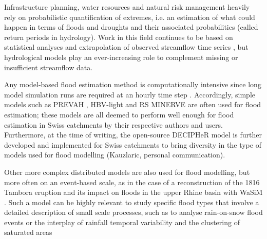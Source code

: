 \documentclass[10pt,a4paper]{article}
\begin{document}
Infrastructure planning, water resources and natural risk management heavily rely on probabilistic quantification of extremes, i.e. an estimation of what could happen in terms of floods and droughts and their associated probabilities (called return periods in hydrology). Work in this field continues to be based on statistical analyses and extrapolation of observed streamflow time series \citep{Brunner2018, Asadi20108}, but hydrological models play an ever-increasing role to complement missing or insufficient streamflow data.

Any model-based flood estimation method is computationally intensive since long model simulation runs are required at an hourly time step \citep[see][about reducing computational requirements for extreme flood estimation by hydrological modelling]{SikorskaSenoner2020}. Accordingly, simple models such as PREVAH \citep{Viviroli2009, Viviroli2009c, Felder2017}, HBV-light \citep{Sikorska2017, Brunner2019a, SikorskaSenoner2020} and  RS MINERVE \citep{Bieri2013, Zeimetz2017, Zeimetz2018} are often used for flood estimation; these models are all deemed to perform well enough for flood estimation in Swiss catchments by their respective authors and users. Furthermore, at the time of writing, the open-source DECIPHeR model is further developed and implemented for Swiss catchments to bring diversity in the type of models used for flood modelling (Kauzlaric, personal communication).

Other more complex distributed models are also used for flood modelling, but more often on an event-based scale, as in the case of a reconstruction of the 1816 Tambora eruption and its impact on floods in the upper Rhine basin with WaSiM \citep[see Fig. \ref{fig:map};][]{Rossler2018}. Such a model can be highly relevant to study specific flood types that involve a detailed description of small scale processes, such as to analyse  rain-on-snow flood events \citep[][with WaSiM]{Rossler2014} or the interplay of rainfall temporal variability and the clustering of saturated areas \citep[][with TOPKAPI-ETH]{Paschalis2014}
\end{document}
